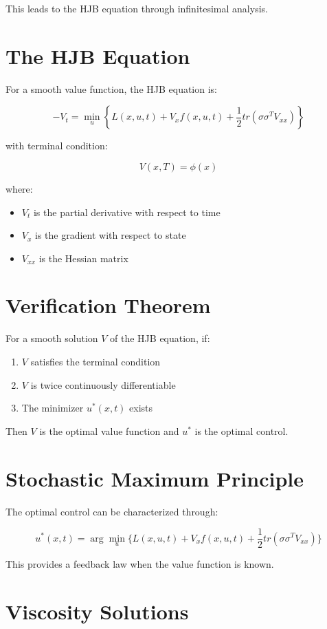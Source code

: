 \documentclass{article}
\begin{document}
This leads to the HJB equation through infinitesimal analysis.

\section{The HJB Equation}

For a smooth value function, the HJB equation is:

\[ -V_t = \min_{u}\left\{L(x,u,t) + V_x f(x,u,t) + \frac{1}{2}tr(\sigma\sigma^T V_{xx})\right\} \]

with terminal condition:

\[ V(x,T) = \phi(x) \]

where:
\begin{itemize}
\item $V_t$ is the partial derivative with respect to time
\item $V_x$ is the gradient with respect to state
\item $V_{xx}$ is the Hessian matrix
\end{itemize}

\section{Verification Theorem}

For a smooth solution $V$ of the HJB equation, if:

\begin{enumerate}
\item $V$ satisfies the terminal condition
\item $V$ is twice continuously differentiable
\item The minimizer $u^*(x,t)$ exists
\end{enumerate}

Then $V$ is the optimal value function and $u^*$ is the optimal control.

\section{Stochastic Maximum Principle}

The optimal control can be characterized through:

\[ u^*(x,t) = \arg\min_{u} \{L(x,u,t) + V_x f(x,u,t) + \frac{1}{2}tr(\sigma\sigma^T V_{xx})\} \]

This provides a feedback law when the value function is known.

\section{Viscosity Solutions}
\end{document}
